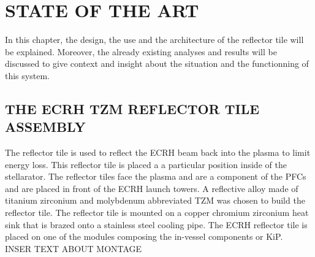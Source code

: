 \chapter{STATE OF THE ART}
\normalsize{In this chapter, the design, the use and the architecture of the reflector tile will be explained. Moreover, the already existing analyses and results will be discussed to give context and insight about the situation and the functionning of this system.}
\section{THE \acrshort{ECRH} \acrshort{TZM} REFLECTOR TILE ASSEMBLY}
\normalsize{The reflector tile is used to reflect the \acrshort{ECRH} beam back into the plasma to limit energy loss. This reflector tile is placed a a particular position inside of the stellarator. The reflector tiles face the plasma and are a component of the \acrshort{PFCs} and are placed in front of the \acrshort{ECRH} launch towers. A reflective alloy made of titanium zirconium and molybdenum abbreviated \acrshort{TZM} was chosen to build the reflector tile. The reflector tile is mounted on a copper chromium zirconium heat sink that is brazed onto a stainless steel cooling pipe. The \acrshort{ECRH} reflector tile is placed on one of the modules composing the in-vessel components or \acrshort{KiP}.}
\\
\break
\normalsize{\indent INSER TEXT ABOUT MONTAGE}
